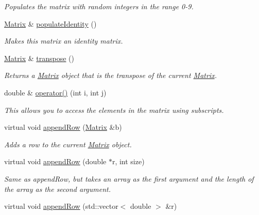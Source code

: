 \begin{CompactItemize}
\begin{CompactList}\small\item\em Populates the matrix with random integers in the range 0-9. \item\end{CompactList}\item 
\hyperlink{class_matrix}{Matrix} \& \hyperlink{class_matrix_0ee71091770a4e83e54860f291ef1b7d}{populateIdentity} ()
\begin{CompactList}\small\item\em Makes this matrix an identity matrix. \item\end{CompactList}\item 
\hyperlink{class_matrix}{Matrix} \& \hyperlink{class_matrix_d609fedfd61e93679803bb114e544569}{transpose} ()
\begin{CompactList}\small\item\em Returns a \hyperlink{class_matrix}{Matrix} object that is the transpose of the current \hyperlink{class_matrix}{Matrix}. \item\end{CompactList}\item 
double \& \hyperlink{class_matrix_83a1c6c6f2f7c88a72a7ee98cae90c24}{operator()} (int i, int j)
\begin{CompactList}\small\item\em This allows you to access the elements in the matrix using subscripts. \item\end{CompactList}\item 
virtual void \hyperlink{class_matrix_20c175983a6b23a83fccfe8f726b3b07}{appendRow} (\hyperlink{class_matrix}{Matrix} \&b)
\begin{CompactList}\small\item\em Adds a row to the current \hyperlink{class_matrix}{Matrix} object. \item\end{CompactList}\item 
virtual void \hyperlink{class_matrix_55104cb3fcf93a887ac713955fc0f5c9}{appendRow} (double $\ast$r, int size)
\begin{CompactList}\small\item\em Same as appendRow, but takes an array as the first argument and the length of the array as the second argument. \item\end{CompactList}\item 
virtual void \hyperlink{class_matrix_934b0686d9a2b971e9740b9a29224a54}{appendRow} (std::vector$<$ double $>$ \&r)

\end{CompactItemize}

